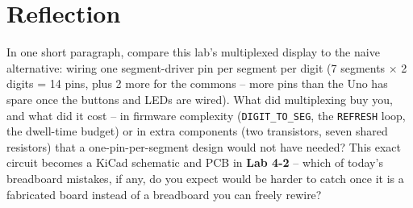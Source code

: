 \documentclass[11pt]{article}
\begin{document}
\section*{Reflection}

In one short paragraph, compare this lab's multiplexed display to the naive
alternative: wiring one segment-driver pin per segment per digit (7 segments
$\times$ 2 digits = 14 pins, plus 2 more for the commons -- more pins than the Uno
has spare once the buttons and LEDs are wired). What did multiplexing buy you, and
what did it cost -- in firmware complexity (\texttt{DIGIT\_TO\_SEG}, the
\texttt{REFRESH} loop, the dwell-time budget) or in extra components (two
transistors, seven shared resistors) that a one-pin-per-segment design would not
have needed? This exact circuit becomes a KiCad schematic and PCB in
\textbf{Lab 4-2} -- which of today's breadboard mistakes, if any, do you expect
would be harder to catch once it is a fabricated board instead of a breadboard you
can freely rewire?
\end{document}
